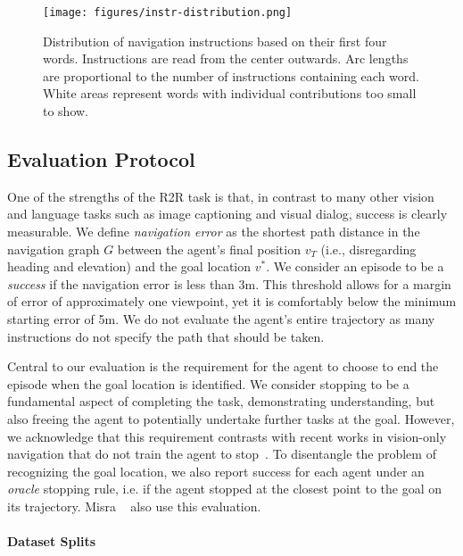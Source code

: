 \documentclass[10pt,twocolumn,letterpaper]{article}
\begin{document}
\begin{figure}[t]
	\begin{center}
		\texttt{[image: figures/instr-distribution.png]}
	\end{center}
	\caption{Distribution of navigation instructions based on their first four words. Instructions are read from the center outwards. Arc lengths are proportional to the number of instructions containing each word. White areas represent words with individual contributions too small to show.}
	\label{fig:distribution}
\end{figure}


\subsection{Evaluation Protocol}
\label{sec:evaluation}

One of the strengths of the R2R task is that, in contrast to many other vision and language tasks such as image captioning and visual dialog, success is clearly measurable. We define \textit{navigation error} as the shortest path distance in the navigation graph $G$ between the agent's final position $v_T$ (i.e., disregarding heading and elevation) and the goal location $v^*$. We consider an episode to be a \textit{success} if the navigation error is less than 3m. This threshold allows for a margin of error of approximately one viewpoint, yet it is comfortably below the minimum starting error of 5m. We do not evaluate the agent's entire trajectory as many instructions do not specify the path that should be taken. 

Central to our evaluation is the requirement for the agent to choose to end the episode when the goal location is identified. We consider stopping to be a fundamental aspect of completing the task, demonstrating understanding, but also freeing the agent to potentially undertake further tasks at the goal. However, we acknowledge that this requirement contrasts with recent works in vision-only navigation that do not train the agent to stop~\cite{zhu2017icra,mirowski2016learning}. To disentangle the problem of recognizing the goal location, we also report success for each agent under an \textit{oracle} stopping rule, i.e. if the agent stopped at the closest point to the goal on its trajectory. Misra \etal~\cite{misra2017mapping} also use this evaluation.

\vspace{-0.3cm}
\paragraph{Dataset Splits}
\end{document}
